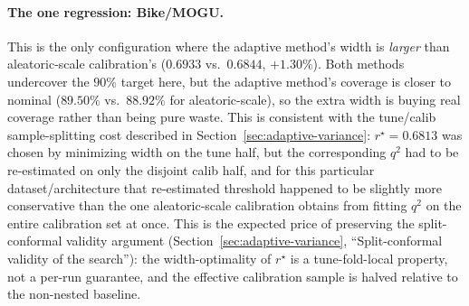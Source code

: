 \documentclass[11pt]{article}
\begin{document}
\paragraph{The one regression: Bike/MOGU.} This is the only configuration where the adaptive
method's width is \emph{larger} than aleatoric-scale calibration's ($0.6933$ vs.\ $0.6844$,
$+1.30\%$). Both methods undercover the $90\%$ target here, but the adaptive method's coverage is
closer to nominal ($89.50\%$ vs.\ $88.92\%$ for aleatoric-scale), so the extra width is buying real
coverage rather than being pure waste. This is consistent with the tune/calib sample-splitting cost
described in Section~\ref{sec:adaptive-variance}: $r^\star=0.6813$ was chosen by minimizing width
on the tune half, but the corresponding $q^2$ had to be re-estimated on only the disjoint calib
half, and for this particular dataset/architecture that re-estimated threshold happened to be
slightly more conservative than the one aleatoric-scale calibration obtains from fitting $q^2$ on
the entire calibration set at once. This is the expected price of preserving the split-conformal
validity argument (Section~\ref{sec:adaptive-variance}, ``Split-conformal validity of the
search''): the width-optimality of $r^\star$ is a tune-fold-local property, not a per-run
guarantee, and the effective calibration sample is halved relative to the non-nested baseline.
\end{document}
